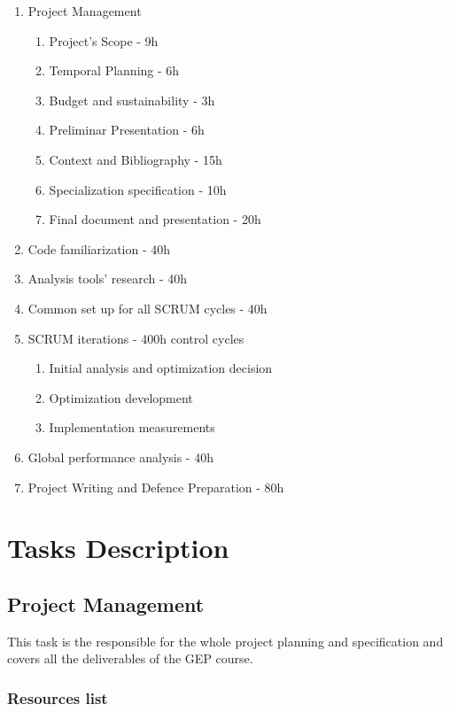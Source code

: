 \begin{enumerate}
\item Project Management
\begin{enumerate}
\item Project's Scope - 9h
\item Temporal Planning - 6h
\item Budget and sustainability - 3h
\item Preliminar Presentation - 6h
\item Context and Bibliography - 15h
\item Specialization specification - 10h
\item Final document and presentation - 20h
\end{enumerate}
\item Code familiarization - 40h
\item Analysis tools' research - 40h
\item Common set up for all SCRUM cycles - 40h
\item SCRUM iterations - 400h control cycles
\begin{enumerate}
\item Initial analysis and optimization decision
\item Optimization development
\item Implementation measurements
\end{enumerate}
\item Global performance analysis - 40h

\item Project Writing and Defence Preparation - 80h
\end{enumerate}

\section{Tasks Description}


\subsection{Project Management}

This task is the responsible for the whole project planning and specification and covers all the deliverables of the GEP course. 

\subsubsection{Resources list}

